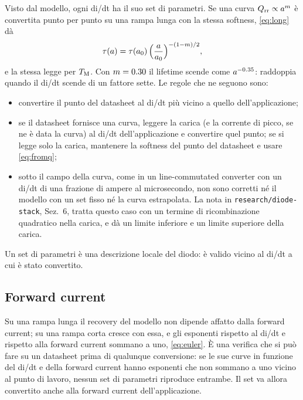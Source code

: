 \documentclass[10pt,a4paper]{scrartcl}
\let\newcommand\lmitdefine
\newcommand{\Qrr}{Q_\mathrm{rr}}
\newcommand{\TM}{T_\mathrm{M}}
\begin{document}
Visto dal modello, ogni di/dt ha il suo set di parametri. Se una curva $\Qrr \propto a^{m}$ è convertita punto per punto su una rampa lunga con la stessa softness, \eqref{eq:long} dà
\begin{equation}
\tau(a) = \tau(a_0)\,\Bigl(\frac{a}{a_0}\Bigr)^{-(1-m)/2} ,
\label{eq:taucurve}
\end{equation}
e la stessa legge per $\TM$. Con $m = 0.30$ il lifetime scende come $a^{-0.35}$: raddoppia quando il di/dt scende di un fattore sette. Le regole che ne seguono sono:
\begin{itemize}
\item convertire il punto del datasheet al di/dt più vicino a quello dell'applicazione;
\item se il datasheet fornisce una curva, leggere la carica (e la corrente di picco, se ne è data la curva) al di/dt dell'applicazione e convertire quel punto; se si legge solo la carica, mantenere la softness del punto del datasheet e usare \eqref{eq:fromq};
\item sotto il campo della curva, come in un line-commutated converter con un di/dt di una frazione di ampere al microsecondo, non sono corretti né il modello con un set fisso né la curva estrapolata. La nota in \texttt{research/diode-stack}, Sez.~6, tratta questo caso con un termine di ricombinazione quadratico nella carica, e dà un limite inferiore e un limite superiore della carica.
\end{itemize}
Un set di parametri è una descrizione locale del diodo: è valido vicino al di/dt a cui è stato convertito.

\subsection{Forward current}
Su una rampa lunga il recovery del modello non dipende affatto dalla forward current; su una rampa corta cresce con essa, e gli esponenti rispetto al di/dt e rispetto alla forward current sommano a uno, \eqref{eq:euler}. È una verifica che si può fare su un datasheet prima di qualunque conversione: se le sue curve in funzione del di/dt e della forward current hanno esponenti che non sommano a uno vicino al punto di lavoro, nessun set di parametri riproduce entrambe. Il set va allora convertito anche alla forward current dell'applicazione.
\end{document}
